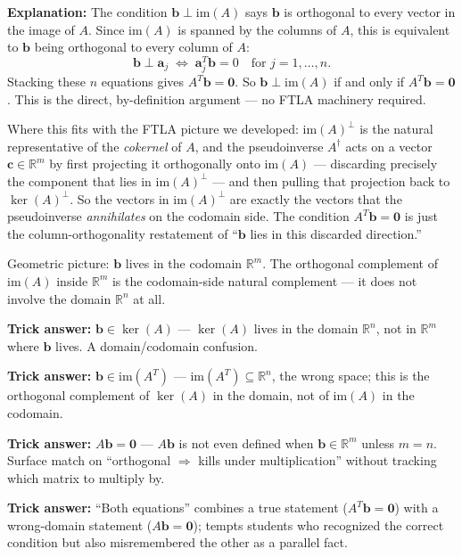 \documentclass[12pt]{amsart}
\begin{document}
\textbf{Explanation:}
The condition $\mathbf{b} \perp \mathrm{im}(A)$ says $\mathbf{b}$ is orthogonal
to every vector in the image of $A$. Since $\mathrm{im}(A)$ is spanned by the
columns of $A$, this is equivalent to $\mathbf{b}$ being orthogonal to every
column of $A$:
$$\mathbf{b} \perp \mathbf{a}_j \;\Leftrightarrow\; \mathbf{a}_j^T \mathbf{b} = 0 \quad \text{for } j = 1, \ldots, n.$$
Stacking these $n$ equations gives $A^T \mathbf{b} = \mathbf{0}$. So
$\mathbf{b} \perp \mathrm{im}(A)$ if and only if $A^T \mathbf{b} = \mathbf{0}$.
This is the direct, by-definition argument --- no FTLA machinery required.

Where this fits with the FTLA picture we developed: $\mathrm{im}(A)^\perp$ is
the natural representative of the \emph{cokernel} of $A$, and the pseudoinverse
$A^\dagger$ acts on a vector $\mathbf{c} \in \mathbb{R}^m$ by first projecting
it orthogonally onto $\mathrm{im}(A)$ --- discarding precisely the component
that lies in $\mathrm{im}(A)^\perp$ --- and then pulling that projection back
to $\ker(A)^\perp$. So the vectors in $\mathrm{im}(A)^\perp$ are exactly the
vectors that the pseudoinverse \emph{annihilates} on the codomain side. The
condition $A^T \mathbf{b} = \mathbf{0}$ is just the column-orthogonality
restatement of ``$\mathbf{b}$ lies in this discarded direction.''

Geometric picture: $\mathbf{b}$ lives in the codomain $\mathbb{R}^m$. The
orthogonal complement of $\mathrm{im}(A)$ inside $\mathbb{R}^m$ is the
codomain-side natural complement --- it does not involve the domain
$\mathbb{R}^n$ at all.

\textbf{Trick answer:}
$\mathbf{b} \in \ker(A)$ --- $\ker(A)$ lives in the domain $\mathbb{R}^n$,
not in $\mathbb{R}^m$ where $\mathbf{b}$ lives. A domain/codomain confusion.

\textbf{Trick answer:}
$\mathbf{b} \in \mathrm{im}(A^T)$ --- $\mathrm{im}(A^T) \subseteq \mathbb{R}^n$,
the wrong space; this is the orthogonal complement of $\ker(A)$ in the
domain, not of $\mathrm{im}(A)$ in the codomain.

\textbf{Trick answer:}
$A\mathbf{b} = \mathbf{0}$ --- $A\mathbf{b}$ is not even defined when
$\mathbf{b} \in \mathbb{R}^m$ unless $m = n$. Surface match on
``orthogonal $\Rightarrow$ kills under multiplication'' without tracking
which matrix to multiply by.

\textbf{Trick answer:}
``Both equations'' combines a true statement ($A^T\mathbf{b} = \mathbf{0}$)
with a wrong-domain statement ($A\mathbf{b} = \mathbf{0}$); tempts students
who recognized the correct condition but also misremembered the other as
a parallel fact.
\end{document}
